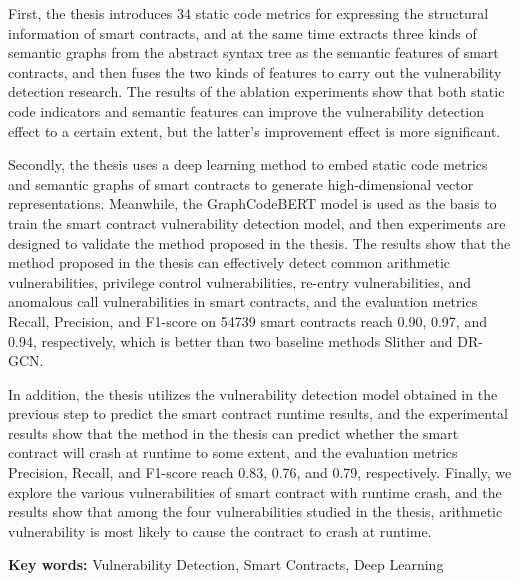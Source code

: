 First, the thesis introduces 34 static code metrics for expressing the structural information of smart contracts, and at the same time extracts three kinds of semantic graphs from the abstract syntax tree as the semantic features of smart contracts, and then fuses the two kinds of features to carry out the vulnerability detection research. The results of the ablation experiments show that both static code indicators and semantic features can improve the vulnerability detection effect to a certain extent, but the latter's improvement effect is more significant.

Secondly, the thesis uses a deep learning method to embed static code metrics and semantic graphs of smart contracts to generate high-dimensional vector representations. Meanwhile, the GraphCodeBERT model is used as the basis to train the smart contract vulnerability detection model, and then experiments are designed to validate the method proposed in the thesis. The results show that the method proposed in the thesis can effectively detect common arithmetic vulnerabilities, privilege control vulnerabilities, re-entry vulnerabilities, and anomalous call vulnerabilities in smart contracts, and the evaluation metrics Recall, Precision, and F1-score on \num{54739} smart contracts reach 0.90, 0.97, and 0.94, respectively, which is better than two baseline methods Slither and DR-GCN.
    
In addition, the thesis utilizes the vulnerability detection model obtained in the previous step to predict the smart contract runtime results, and the experimental results show that the method in the thesis can predict whether the smart contract will crash at runtime to some extent, and the evaluation metrics Precision, Recall, and F1-score reach 0.83, 0.76, and 0.79, respectively. Finally, we explore the various vulnerabilities of smart contract with runtime crash, and the results show that among the four vulnerabilities studied in the thesis, arithmetic vulnerability is most likely to cause the contract to crash at runtime.

\hspace*{\fill}

\noindent \textbf{Key words: } Vulnerability Detection, Smart Contracts, Deep Learning
